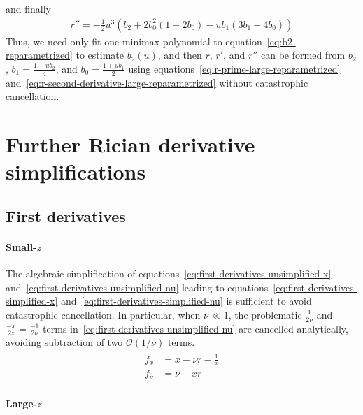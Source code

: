 \documentclass{article}
\begin{document}
%
and finally
%
\begin{align}\label{eq:r-second-derivative-large-reparametrized}
  \boxed{r'' = -\frac{1}{2} u^3 (b_2 + 2 b_0^2 (1 + 2 b_0) - u b_1 (3 b_1 + 4 b_0))}
\end{align}
%
Thus, we need only fit one minimax polynomial to equation~\eqref{eq:b2-reparametrized} to estimate $b_2(u)$, and then $r$, $r'$, and $r''$ can be formed from $b_2$, $b_1 = \frac{1 + u b_2}{4}$, and $b_0 = \frac{1 + u b_1}{2}$ using equations~\eqref{eq:r-prime-large-reparametrized} and~\eqref{eq:r-second-derivative-large-reparametrized} without catastrophic cancellation.

%

\section{Further Rician derivative simplifications}

\subsection{First derivatives}

\paragraph{Small-$z$}

The algebraic simplification of equations~\eqref{eq:first-derivatives-unsimplified-x} and~\eqref{eq:first-derivatives-unsimplified-nu} leading to equations~\eqref{eq:first-derivatives-simplified-x} and~\eqref{eq:first-derivatives-simplified-nu} is sufficient to avoid catastrophic cancellation.
In particular, when $\nu \ll 1$, the problematic $\frac{1}{2\nu}$ and $\frac{-x}{2z} = \frac{-1}{2\nu}$ terms in~\eqref{eq:first-derivatives-unsimplified-nu} are cancelled analytically, avoiding subtraction of two $\mathcal{O}(1/\nu)$ terms.
%
\begin{align}\label{eq:first-derivatives-small-z}
  \boxed{
    \begin{aligned}
      f_x   & = x - \nu r - \frac{1}{x} \\
      f_\nu & = \nu - x r
    \end{aligned}
  }
\end{align}

\paragraph{Large-$z$}
\end{document}
